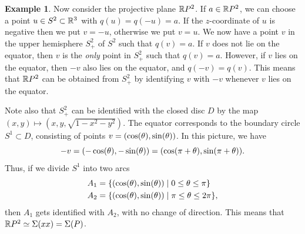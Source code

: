 \documentclass[reqno]{amsart}
\theoremstyle{definition}
\newtheorem{example}[theorem]{Example}
\begin{document}
\begin{example}\label{eg-pplane-word}
 Now consider the projective plane $\mathbb{R} P^2$.  If $a\in\mathbb{R} P^2$, we can
 choose a point $u\in S^2\subset\mathbb{R}^3$ with $q(u)=q(-u)=a$.  If the
 $z$-coordinate of $u$ is negative then we put $v=-u$, otherwise we
 put $v=u$.  We now have a point $v$ in the upper hemisphere $S^2_+$
 of $S^2$ such that $q(v)=a$.  If $v$ does not lie on the equator,
 then $v$ is the \emph{only} point in $S^2_+$ such that $q(v)=a$.
 However, if $v$ lies on the equator, then $-v$ also lies on the
 equator, and $q(-v)=q(v)$.  This means that $\mathbb{R} P^2$ can be obtained
 from $S^2_+$ by identifying $v$ with $-v$ whenever $v$ lies on the
 equator.  

 Note also that $S^2_+$ can be identified with the closed disc
 $D$ by the map $(x,y)\mapsto(x,y,\sqrt{1-x^2-y^2})$.  The
 equator corresponds to the boundary circle $S^1\subset D$,
 consisting of points $v=(\cos(\theta),\sin(\theta))$.  In this picture,
 we have
 \[ -v = (-\cos(\theta),-\sin(\theta)) = (\cos(\pi+\theta),\sin(\pi+\theta)).
 \]
 Thus, if we divide $S^1$ into two arcs
 \begin{align*}
  A_1 &= \{(\cos(\theta),\sin(\theta))\;|\; 0\leq\theta\leq\pi\} \\
  A_2 &= \{(\cos(\theta),\sin(\theta))\;|\; \pi\leq\theta\leq 2\pi\},
 \end{align*}
 then $A_1$ gets identified with $A_2$, with no change of direction.
 This means that $\mathbb{R} P^2\simeq \Sigma(xx)=\Sigma(P)$.
\end{example}
\end{document}
